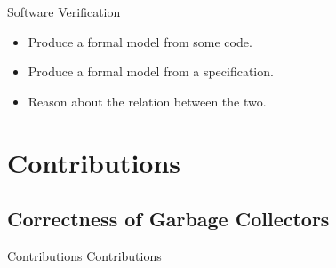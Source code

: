 \documentclass[usenames,dvipsnames]{beamer}
\begin{document}
\begin{frame}{Software Verification}
  \begin{itemize}
  \item Produce a formal model from some code.
  \item Produce a formal model from a specification.
  \item Reason about the relation between the two.
  \end{itemize}



\end{frame}


\section{Contributions}
\subsection{Correctness of Garbage Collectors}

\begin{frame}{Contributions}
  \centering \huge Contributions

\end{frame}
\end{document}

